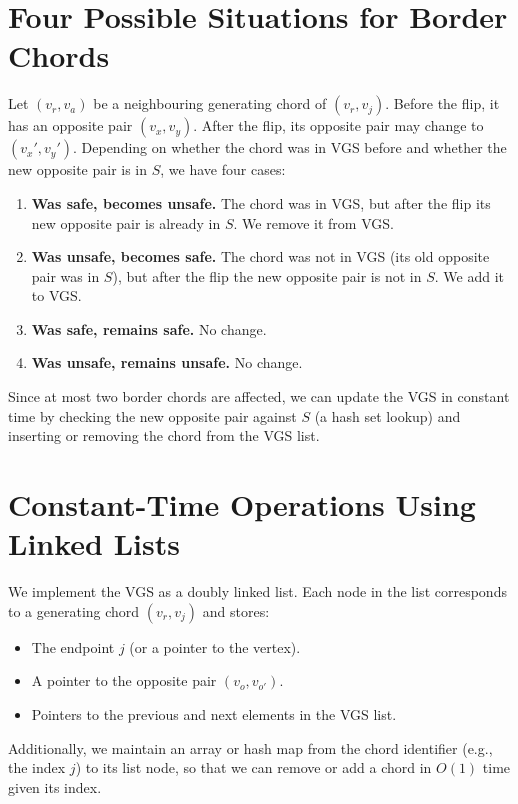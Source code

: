 \section{Four Possible Situations for Border Chords}
\label{sec:vgs_four_cases}

Let \((v_r, v_a)\) be a neighbouring generating chord of \((v_r, v_j)\). 
Before the flip, it has an opposite pair \((v_x, v_y)\). 
After the flip, its opposite pair may change to \((v_x', v_y')\). 
Depending on whether the chord was in VGS before and whether the new opposite pair is in \(S\), we have four cases:

\begin{enumerate}
    \item \textbf{Was safe, becomes unsafe.} 
    The chord was in VGS, but after the flip its new opposite pair is already in \(S\). 
    We remove it from VGS.
    
    \item \textbf{Was unsafe, becomes safe.} 
    The chord was not in VGS (its old opposite pair was in \(S\)), but after the flip the new opposite pair is not in \(S\). 
    We add it to VGS.
    
    \item \textbf{Was safe, remains safe.} 
    No change.
    
    \item \textbf{Was unsafe, remains unsafe.} 
    No change.
\end{enumerate}

Since at most two border chords are affected, we can update the VGS in constant time by checking the new opposite pair against \(S\) (a hash set lookup) and inserting or removing the chord from the VGS list.

\section{Constant-Time Operations Using Linked Lists}
\label{sec:vgs_linked_lists}

We implement the VGS as a doubly linked list. 
Each node in the list corresponds to a generating chord \((v_r, v_j)\) and stores:
\begin{itemize}
    \item The endpoint \(j\) (or a pointer to the vertex).
    \item A pointer to the opposite pair \((v_o, v_{o'})\).
    \item Pointers to the previous and next elements in the VGS list.
\end{itemize}
Additionally, we maintain an array or hash map from the chord identifier (e.g., the index \(j\)) to its list node, so that we can remove or add a chord in \(O(1)\) time given its index.

